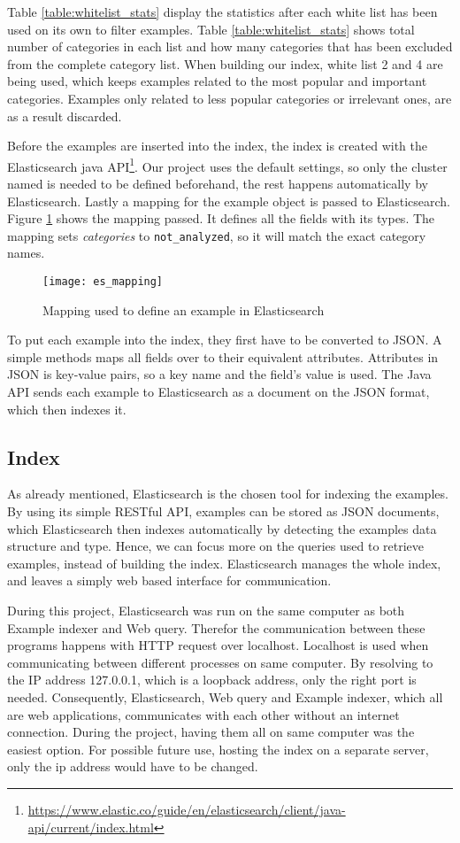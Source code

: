 Table \ref{table:whitelist_stats} display the statistics after each white list has been used on its own to filter examples. Table \ref{table:whitelist_stats} shows total number of categories in each list and how many categories that has been excluded from the complete category list.
When building our index, white list 2 and 4 are being used, which keeps examples related to the most popular and important categories. Examples only related to less popular categories or irrelevant ones, are as a result discarded.



Before the examples are inserted into the index, the index is created with the Elasticsearch java API\footnote{\url{https://www.elastic.co/guide/en/elasticsearch/client/java-api/current/index.html}}. Our project uses the default settings, so only the cluster named is needed to be defined beforehand, the rest happens automatically by Elasticsearch. Lastly a mapping for the example object is passed to Elasticsearch. Figure \ref{fig:es_mapping} shows the mapping passed. It defines all the fields with its types. The mapping sets \textit{categories} to \texttt{not\_analyzed}, so it will match the exact category names.

\begin{figure}[H] 
\caption{Mapping used to define an example in Elasticsearch}
\centering
\texttt{[image: es\_mapping]}
\label{fig:es_mapping}
\end{figure}

To put each example into the index, they first have to be converted to JSON. A simple methods maps all fields over to their equivalent attributes. Attributes in JSON is key-value pairs, so a key name and the field's value is used. The Java API sends each example to Elasticsearch as a document on the JSON format, which then indexes it.

\subsection{Index}
As already mentioned, Elasticsearch is the chosen tool for indexing the examples. By using its simple RESTful API, examples can be stored as JSON documents, which Elasticsearch then indexes automatically by detecting the examples data structure and type. Hence, we can focus more on the queries used to retrieve examples, instead of building the index. Elasticsearch manages the whole index, and leaves a simply web based interface for communication.

During this project, Elasticsearch was run on the same computer as both Example indexer and Web query. Therefor the communication between these programs happens with HTTP request over localhost. Localhost is used when communicating between different processes on same computer. By resolving to the IP address 127.0.0.1, which is a loopback address, only the right port is needed. Consequently, Elasticsearch, Web query and Example indexer, which all are web applications, communicates with each other without an internet connection. During the project, having them all on same computer was the easiest option. For possible future use, hosting the index on a separate server, only the ip address would have to be changed.

